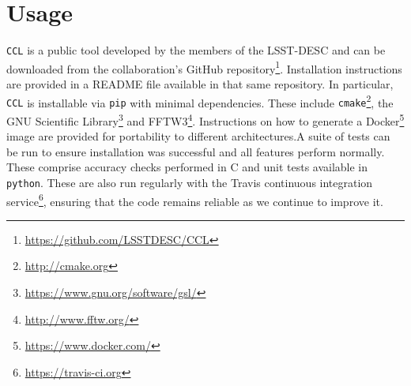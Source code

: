 \documentclass[\docopts]{\docclass}
\newcommand{\elisa}[1]{\textcolor{green!10!orange!90!}{EC: #1}}
\newcommand{\ccl}{{\tt CCL}\xspace}
\begin{document}

\section{Usage}
\label{sec:usage}

\ccl is a public tool developed by the members of the LSST-DESC and can be downloaded from the collaboration's GitHub repository\footnote{\url{https://github.com/LSSTDESC/CCL}}. Installation instructions are provided in a README file available in that same repository. In particular, \ccl is installable via {\tt pip} with minimal dependencies. These include {\tt cmake}\footnote{\url{http://cmake.org}}, the GNU Scientific Library\footnote{\url{https://www.gnu.org/software/gsl/}} and FFTW3\footnote{\url{http://www.fftw.org/}}. Instructions on how to generate a Docker\footnote{\url{https://www.docker.com/}} image are provided for portability to different architectures.A suite of tests can be run to ensure installation was successful and all features perform normally. These comprise accuracy checks performed in C and unit tests available in {\tt python}. These are also run regularly with the Travis continuous integration service\footnote{\url{https://travis-ci.org}}, ensuring that the code remains reliable as we continue to improve it. 
\end{document}
